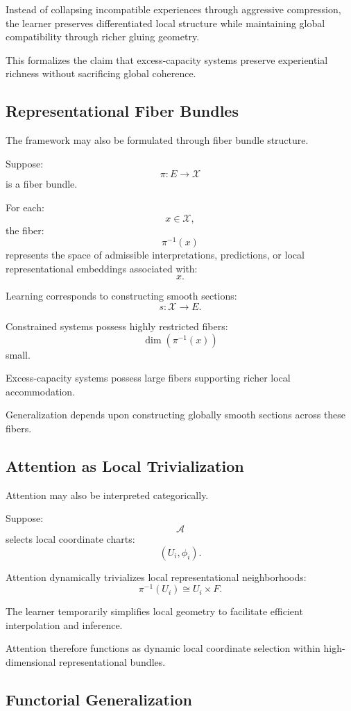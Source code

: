\documentclass[12pt,a4paper]{article}
\begin{document}
Instead of collapsing incompatible experiences through aggressive compression, the learner preserves differentiated local structure while maintaining global compatibility through richer gluing geometry.

This formalizes the claim that excess-capacity systems preserve experiential richness without sacrificing global coherence.

\subsection{Representational Fiber Bundles}

The framework may also be formulated through fiber bundle structure.

Suppose:
\[
\pi :
E
\rightarrow
\mathcal{X}
\]
is a fiber bundle.

For each:
\[
x
\in
\mathcal{X},
\]
the fiber:
\[
\pi^{-1}(x)
\]
represents the space of admissible interpretations, predictions, or local representational embeddings associated with:
\[
x.
\]

Learning corresponds to constructing smooth sections:
\[
s :
\mathcal{X}
\rightarrow
E.
\]

Constrained systems possess highly restricted fibers:
\[
\dim(\pi^{-1}(x))
\]
small.

Excess-capacity systems possess large fibers supporting richer local accommodation.

Generalization depends upon constructing globally smooth sections across these fibers.

\subsection{Attention as Local Trivialization}

Attention may also be interpreted categorically.

Suppose:
\[
\mathcal{A}
\]
selects local coordinate charts:
\[
(U_i,\phi_i).
\]

Attention dynamically trivializes local representational neighborhoods:
\[
\pi^{-1}(U_i)
\cong
U_i\times F.
\]

The learner temporarily simplifies local geometry to facilitate efficient interpolation and inference.

Attention therefore functions as dynamic local coordinate selection within high-dimensional representational bundles.

\subsection{Functorial Generalization}
\end{document}
